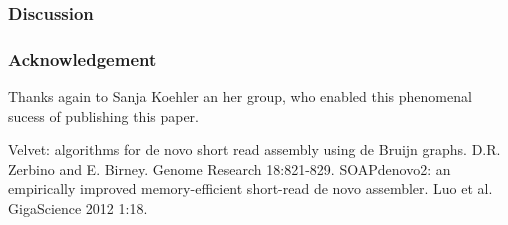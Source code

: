 \documentclass[%
   10pt,              %
   ngerman,           %
   a4paper,           %
   DIV11,             %
]{scrartcl}%
\begin{document}
\subsubsection*{Discussion}

\subsubsection*{Acknowledgement}
Thanks again to Sanja Koehler an her group, who enabled this phenomenal sucess of publishing this paper.

\begin{thebibliography}{20}
	 Velvet: algorithms for de novo short read assembly using de Bruijn graphs. D.R. Zerbino and E. Birney. Genome Research 18:821-829. 
	 SOAPdenovo2: an empirically improved memory-efficient short-read de novo assembler. Luo et al. GigaScience 2012 1:18.
\end{thebibliography}
\end{document}
